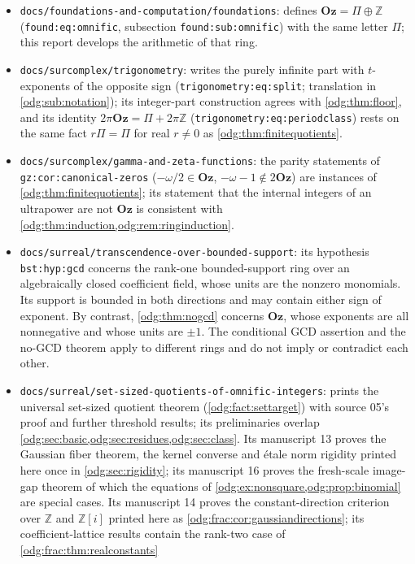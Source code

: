 \documentclass[11pt,oneside]{article}
\numberwithin{equation}{section}
\theoremstyle{definition}
\theoremstyle{remark}
\newcommand{\Oz}{\mathbf{Oz}}
\newcommand{\Z}{\mathbb Z}
\newcommand{\replabel}[1]{\nolinkurl{#1}}
\newcommand{\fn}[1]{\nolinkurl{#1}}
\begin{document}
\begin{itemize}[leftmargin=*]
\item \fn{docs/foundations-and-computation/foundations}: defines
$\Oz=\Pi\oplus\Z$ (\replabel{found:eq:omnific}, subsection
\replabel{found:sub:omnific}) with the same letter $\Pi$; this report develops
the arithmetic of that ring.
\item \fn{docs/surcomplex/trigonometry}: writes the purely infinite part
with $t$-exponents of the opposite sign (\replabel{trigonometry:eq:split};
translation in \cref{odg:sub:notation}); its integer-part construction agrees
with \cref{odg:thm:floor}, and its identity
$2\pi\Oz=\Pi+2\pi\Z$ (\replabel{trigonometry:eq:periodclass}) rests on the same
fact $r\Pi=\Pi$ for real $r\ne0$ as \cref{odg:thm:finitequotients}.
\item \fn{docs/surcomplex/gamma-and-zeta-functions}: the parity statements
of \replabel{gz:cor:canonical-zeros} ($-\omega/2\in\Oz$, $-\omega-1\notin2\Oz$)
are instances of \cref{odg:thm:finitequotients}; its statement that the
internal integers of an ultrapower are not $\Oz$ is consistent with
\cref{odg:thm:induction,odg:rem:ringinduction}.
\item \fn{docs/surreal/transcendence-over-bounded-support}: its
hypothesis \replabel{bst:hyp:gcd} concerns the rank-one bounded-support
ring over an algebraically closed coefficient field, whose units are the
nonzero monomials. Its support is bounded in both directions and may
contain either sign of exponent. By contrast, \cref{odg:thm:nogcd}
concerns $\Oz$, whose exponents are all nonnegative and whose units are
$\pm1$. The conditional GCD assertion and the no-GCD theorem apply to
different rings and do not imply or contradict each other.
\item \fn{docs/surreal/set-sized-quotients-of-omnific-integers}: prints the
universal set-sized quotient theorem (\cref{odg:fact:settarget}) with source
05's proof and further threshold results; its preliminaries overlap
\cref{odg:sec:basic,odg:sec:residues,odg:sec:class}. Its manuscript 13
proves the Gaussian fiber theorem, the kernel converse and \'etale norm
rigidity printed here once in \cref{odg:sec:rigidity}; its manuscript 16
proves the fresh-scale image-gap theorem of which the equations of
\cref{odg:ex:nonsquare,odg:prop:binomial} are special cases. Its manuscript
14 proves the constant-direction criterion over $\Z$ and $\Z[i]$ printed here
as \cref{odg:frac:cor:gaussiandirections}; its coefficient-lattice results
contain the rank-two case of \cref{odg:frac:thm:realconstants}

\end{itemize}
\end{document}
